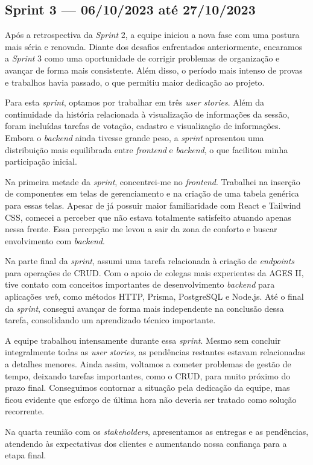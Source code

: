 \clearpage
\subsection{Sprint 3 --- 06/10/2023 até 27/10/2023}

Após a retrospectiva da \textit{Sprint} 2, a equipe iniciou a nova fase com uma postura mais séria e renovada. Diante dos desafios enfrentados anteriormente, encaramos a \textit{Sprint} 3 como uma oportunidade de corrigir problemas de organização e avançar de forma mais consistente. Além disso, o período mais intenso de provas e trabalhos havia passado, o que permitiu maior dedicação ao projeto.

Para esta \textit{sprint}, optamos por trabalhar em três \textit{user stories}. Além da continuidade da história relacionada à visualização de informações da sessão, foram incluídas tarefas de votação, cadastro e visualização de informações. Embora o \textit{backend} ainda tivesse grande peso, a \textit{sprint} apresentou uma distribuição mais equilibrada entre \textit{frontend} e \textit{backend}, o que facilitou minha participação inicial.

Na primeira metade da \textit{sprint}, concentrei-me no \textit{frontend}. Trabalhei na inserção de componentes em telas de gerenciamento e na criação de uma tabela genérica para essas telas. Apesar de já possuir maior familiaridade com React e Tailwind \ac{CSS}, comecei a perceber que não estava totalmente satisfeito atuando apenas nessa frente. Essa percepção me levou a sair da zona de conforto e buscar envolvimento com \textit{backend}.

Na parte final da \textit{sprint}, assumi uma tarefa relacionada à criação de \textit{endpoints} para operações de \ac{CRUD}. Com o apoio de colegas mais experientes da \ac{AGES} II, tive contato com conceitos importantes de desenvolvimento \textit{backend} para aplicações \textit{web}, como métodos \ac{HTTP}, Prisma, PostgreSQL e Node.js. Até o final da \textit{sprint}, consegui avançar de forma mais independente na conclusão dessa tarefa, consolidando um aprendizado técnico importante.

A equipe trabalhou intensamente durante essa \textit{sprint}. Mesmo sem concluir integralmente todas as \textit{user stories}, as pendências restantes estavam relacionadas a detalhes menores. Ainda assim, voltamos a cometer problemas de gestão de tempo, deixando tarefas importantes, como o \ac{CRUD}, para muito próximo do prazo final. Conseguimos contornar a situação pela dedicação da equipe, mas ficou evidente que esforço de última hora não deveria ser tratado como solução recorrente.

Na quarta reunião com os \textit{stakeholders}, apresentamos as entregas e as pendências, atendendo às expectativas dos clientes e aumentando nossa confiança para a etapa final.
